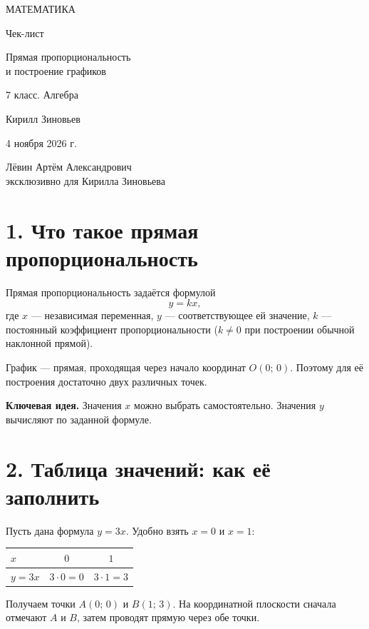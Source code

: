 \documentclass[a4paper,12pt]{article}
\newcommand{\sect}[1]{\vspace{0.55em}\section*{\color{darkaccent}\large #1}\vspace{-0.6em}{\color{accent}\rule{\linewidth}{0.45pt}}\vspace{0.3em}}
\newcommand{\idea}[1]{{\color{darkaccent}\bfseries Ключевая идея.} #1}
\begin{document}
\thispagestyle{empty}
\begin{center}
\vspace*{33mm}
{\small\color{darkaccent}\MakeUppercase{Математика}}\par
\vspace{16mm}
{\LARGE Чек-лист}\par
\vspace{12mm}
{\Large\color{accent} Прямая пропорциональность\\[3pt] и построение графиков}\par
\vspace{12mm}
{\normalsize 7 класс. Алгебра}\par
\vfill
{\large Кирилл Зиновьев}\par
\vspace{10mm}
{4 ноября 2026 г.}\par
\vspace{21mm}
{\small Лёвин Артём Александрович\\ эксклюзивно для Кирилла Зиновьева}\par
\vspace{18mm}
\end{center}
\clearpage

\sect{1. Что такое прямая пропорциональность}
Прямая пропорциональность задаётся формулой
\[
 y=kx,
\]
где $x$ --- независимая переменная, $y$ --- соответствующее ей значение,
$k$ --- постоянный коэффициент пропорциональности ($k\ne 0$ при построении обычной наклонной прямой).

График --- прямая, проходящая через начало координат $O(0;\,0)$.
Поэтому для её построения достаточно двух различных точек.

\idea{Значения $x$ можно выбрать самостоятельно. Значения $y$ вычисляют по заданной формуле.}

\sect{2. Таблица значений: как её заполнить}
Пусть дана формула $y=3x$. Удобно взять $x=0$ и $x=1$:
\begin{center}
\renewcommand{\arraystretch}{1.28}
\begin{tabular}{@{}lcc@{}}
\toprule
$x$ & $0$ & $1$\\
\midrule
$y=3x$ & $3\cdot0=0$ & $3\cdot1=3$\\
\bottomrule
\end{tabular}
\end{center}
Получаем точки $A(0;\,0)$ и $B(1;\,3)$. На координатной плоскости сначала
отмечают $A$ и $B$, затем проводят прямую через обе точки.
\end{document}
